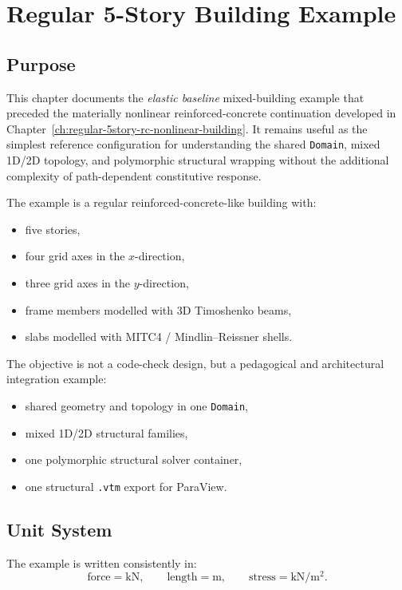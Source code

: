 \chapter{Regular 5-Story Building Example}
\label{ch:regular-5story-building}

\section{Purpose}

This chapter documents the \emph{elastic baseline} mixed-building example that
preceded the materially nonlinear reinforced-concrete continuation developed in
Chapter~\ref{ch:regular-5story-rc-nonlinear-building}.  It remains useful as
the simplest reference configuration for understanding the shared
\texttt{Domain}, mixed 1D/2D topology, and polymorphic structural wrapping
without the additional complexity of path-dependent constitutive response.

The example is a regular reinforced-concrete-like building with:
\begin{itemize}
  \item five stories,
  \item four grid axes in the \(x\)-direction,
  \item three grid axes in the \(y\)-direction,
  \item frame members modelled with 3D Timoshenko beams,
  \item slabs modelled with MITC4 / Mindlin--Reissner shells.
\end{itemize}

The objective is not a code-check design, but a pedagogical and architectural
integration example:
\begin{itemize}
  \item shared geometry and topology in one \texttt{Domain},
  \item mixed 1D/2D structural families,
  \item one polymorphic structural solver container,
  \item one structural \texttt{.vtm} export for ParaView.
\end{itemize}

\section{Unit System}

The example is written consistently in:
\[
\text{force} = \mathrm{kN},
\qquad
\text{length} = \mathrm{m},
\qquad
\text{stress} = \mathrm{kN/m^2}.
\]

